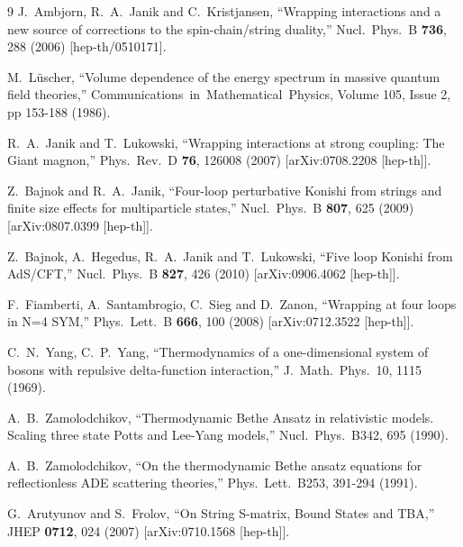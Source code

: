 \documentclass[a4paper,11pt]{article}
\numberwithin{equation}{section}
\begin{document}
\begin{thebibliography} {9}
  J.~Ambjorn, R.~A.~Janik and C.~Kristjansen,
  ``Wrapping interactions and a new source of corrections to the spin-chain/string duality,''
  Nucl.\ Phys.\ B {\bf 736}, 288 (2006)
  [hep-th/0510171].

	M.~L\"{u}scher,
	``Volume dependence of the energy spectrum in massive quantum field theories,''
	Communications\ in\ Mathematical\ Physics, Volume 105, Issue 2, pp 153-188 (1986). 

  R.~A.~Janik and T.~Lukowski,
  ``Wrapping interactions at strong coupling: The Giant magnon,''
  Phys.\ Rev.\ D {\bf 76}, 126008 (2007)
  [arXiv:0708.2208 [hep-th]].

  Z.~Bajnok and R.~A.~Janik,
  ``Four-loop perturbative Konishi from strings and finite size effects for multiparticle states,''
  Nucl.\ Phys.\ B {\bf 807}, 625 (2009)
  [arXiv:0807.0399 [hep-th]].

  Z.~Bajnok, A.~Hegedus, R.~A.~Janik and T.~Lukowski,
  ``Five loop Konishi from AdS/CFT,''
  Nucl.\ Phys.\ B {\bf 827}, 426 (2010)
  [arXiv:0906.4062 [hep-th]].

  F.~Fiamberti, A.~Santambrogio, C.~Sieg and D.~Zanon,
  ``Wrapping at four loops in N=4 SYM,''
  Phys.\ Lett.\ B {\bf 666}, 100 (2008)
  [arXiv:0712.3522 [hep-th]].

	C.~N.~Yang, C.~P.~Yang, 
	``Thermodynamics of a one-dimensional system of bosons with repulsive delta-function interaction,''
	J.\ Math.\ Phys.\ 10, 1115 (1969).

	A.~B.~Zamolodchikov, 
	``Thermodynamic Bethe Ansatz in relativistic models. Scaling three state Potts and Lee-Yang models,''
	Nucl.\ Phys.\ B342, 695 (1990).

	A.~B.~Zamolodchikov,
	``On the thermodynamic Bethe ansatz equations for reflectionless ADE scattering theories,''
	Phys.\ Lett.\ B253, 391-294 (1991).

  G.~Arutyunov and S.~Frolov,
  ``On String S-matrix, Bound States and TBA,''
  JHEP {\bf 0712}, 024 (2007)
  [arXiv:0710.1568 [hep-th]].


\end{thebibliography}
\end{document}
